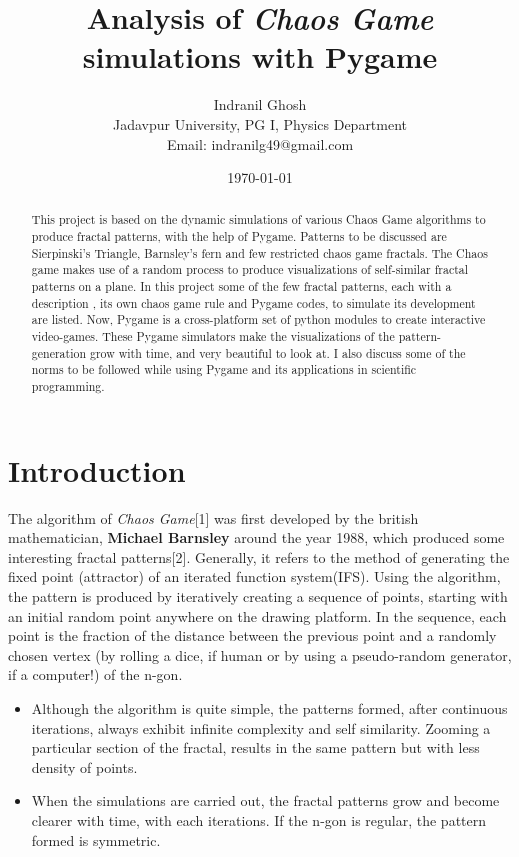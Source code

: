 \documentclass{article}
\title{\textbf{Analysis of \textit{Chaos Game} simulations with Pygame}}
\author{Indranil Ghosh\\Jadavpur University, PG I, Physics Department\\Email: indranilg49@gmail.com}
\date{\today}
\begin{document}
\maketitle

\tableofcontents

\begin{abstract}
This project is based on the dynamic simulations of various Chaos Game algorithms to produce fractal patterns, with the help of Pygame. Patterns to be discussed are Sierpinski’s Triangle, Barnsley’s fern and few restricted chaos game fractals. The Chaos game makes use of a random process to produce visualizations of self-similar fractal patterns on a plane. In this project some of the few fractal patterns, each with a description , its own chaos game rule and Pygame codes, to simulate its development are listed. Now, Pygame is a cross-platform set of python modules to create interactive video-games. These Pygame simulators make the visualizations of the pattern-generation grow with time, and very beautiful to look at. I also discuss some of the norms to be followed while using Pygame and its applications in scientific programming. 
\end{abstract}

\section{Introduction}
The algorithm of \textit{Chaos Game}[1] was first developed by the british mathematician, \textbf{Michael Barnsley} around the year 1988, which produced some interesting fractal patterns[2]. Generally, it refers to the method of generating the fixed point (attractor) of an iterated function system(IFS). Using the algorithm, the pattern is produced by iteratively creating a sequence of points, starting with an initial random point anywhere on the drawing platform. In the sequence, each point is the fraction of the distance between the previous point and a randomly chosen vertex (by rolling a dice, if human or by using a pseudo-random generator, if a computer!) of the n-gon.\\

\begin{itemize}
\item Although the algorithm is quite simple, the patterns formed, after continuous iterations, always exhibit infinite complexity and self similarity. Zooming a particular section of the fractal, results in the same pattern but with less density of points.\\
\item When the simulations are carried out, the fractal patterns grow and become clearer with time, with each iterations. If the n-gon is regular, the pattern formed is symmetric.
\end{itemize}
\end{document}

